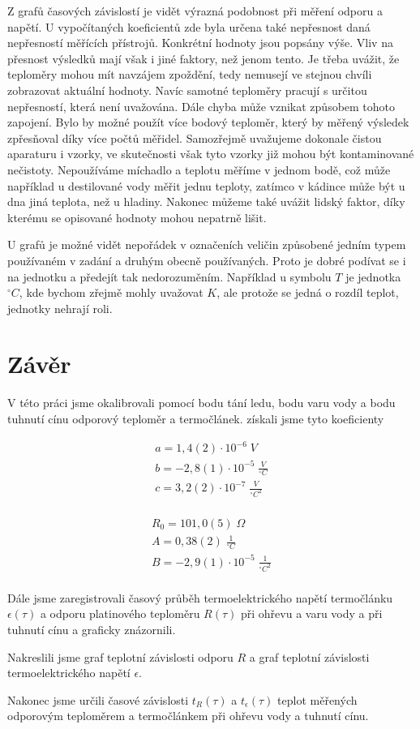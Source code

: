 Z grafů časových závislostí je vidět výrazná podobnost při měření odporu a napětí. U vypočítaných koeficientů zde byla určena také nepřesnost daná nepřesností měřících přístrojů. Konkrétní hodnoty jsou popsány výše. Vliv na přesnost výsledků mají však i jiné faktory, než jenom tento. Je třeba uvážit, že teploměry mohou mít navzájem zpoždění, tedy nemusejí ve stejnou chvíli zobrazovat aktuální hodnoty. Navíc samotné teploměry pracují s určitou nepřesností, která není uvažována. Dále chyba může vznikat způsobem tohoto zapojení. Bylo by možné použít více bodový teploměr, který by měřený výsledek zpřesňoval díky více počtů měřidel. Samozřejmě uvažujeme dokonale čistou aparaturu i vzorky, ve skutečnosti však tyto vzorky již mohou být kontaminované nečistoty. Nepoužíváme míchadlo a teplotu měříme v jednom bodě, což může například u destilované vody měřit jednu teploty, zatímco v kádince může být u dna jiná teplota, než u hladiny. Nakonec můžeme také uvážit lidský faktor, díky kterému se opisované hodnoty mohou nepatrně lišit.

U grafů je možné vidět nepořádek v označeních veličin způsobené jedním typem používaném v zadání a druhým obecně používaných. Proto je dobré podívat se i na jednotku a předejít tak nedorozuměním. Například u symbolu $T$ je jednotka $^\circ C$, kde bychom zřejmě mohly uvažovat $K$, ale protože se jedná o rozdíl teplot, jednotky nehrají roli.

\section{Závěr}

V této práci jsme okalibrovali pomocí bodu tání ledu, bodu varu vody a bodu tuhnutí cínu odporový teploměr a termočlánek. získali jsme tyto koeficienty

\begin{align*}
    a = 1,4(2) \cdot 10^{-6} \; V\\
    b = -2,8(1) \cdot 10^{-5} \; \frac{V}{^\circ C}\\
    c = 3,2(2) \cdot 10^{-7} \; \frac{V}{^\circ C^2} \\
\end{align*}

\begin{align*}
    R_0 = 101,0(5) \; \Omega \\
    A = 0,38(2) \; \frac{1}{^\circ C} \\
    B = -2,9(1) \cdot 10^{-5} \; \frac{1}{^\circ C^2} \\
\end{align*}

Dále jsme zaregistrovali časový průběh termoelektrického napětí termočlánku $\epsilon (\tau)$ a odporu platinového teploměru $R(\tau)$ při ohřevu a varu vody a při tuhnutí cínu a graficky znázornili.

Nakreslili jsme graf teplotní závislosti odporu $R$ a graf teplotní závislosti termoelektrického napětí $\epsilon$.

 Nakonec jsme určili časové závislosti $t_R(\tau)$ a $t_\epsilon(\tau)$ teplot měřených odporovým teploměrem a termočlánkem při ohřevu vody a tuhnutí cínu.